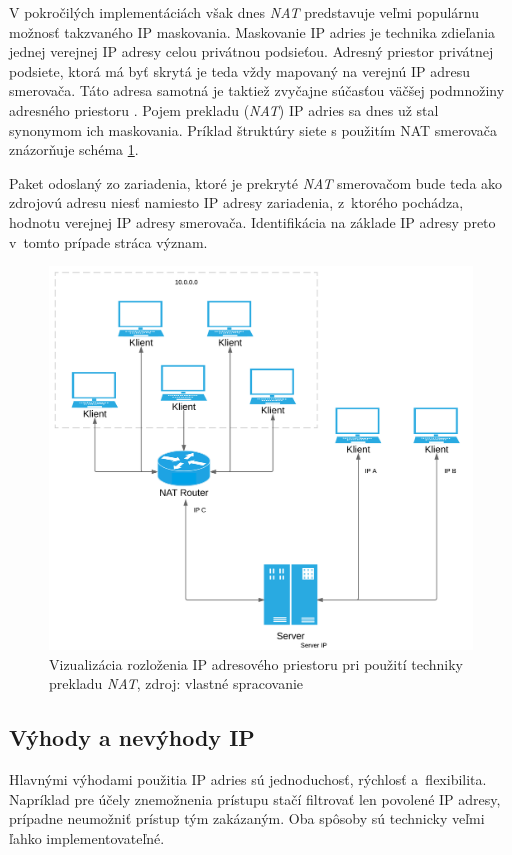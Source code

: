 \documentclass[
  printed, %
  table,   %
  lof,     %
  nolot,   %
  nocover
]{fithesis3}
\begin{document}
V pokročilých
implementáciách však dnes \textit{NAT} predstavuje veľmi populárnu možnosť
takzvaného  IP maskovania. Maskovanie IP adries je technika zdieľania jednej
verejnej IP adresy celou privátnou podsieťou. Adresný priestor privátnej
podsiete, ktorá má byť skrytá je teda vždy mapovaný na verejnú IP adresu
smerovača. Táto adresa samotná je taktiež zvyčajne súčasťou väčšej podmnožiny
adresného priestoru \cite{Huston:NAT}. Pojem prekladu (\textit{NAT}) IP adries sa dnes už stal
synonymom ich maskovania. Príklad štruktúry siete s použitím NAT smerovača znázorňuje
schéma \ref{fig:tech-IP-NAT}.

Paket odoslaný zo zariadenia, ktoré je prekryté
\textit{NAT} smerovačom bude teda ako zdrojovú adresu niesť namiesto IP adresy
zariadenia, z~ktorého pochádza, hodnotu verejnej IP adresy smerovača.
Identifikácia na základe IP adresy preto v~tomto prípade stráca význam.

\begin{figure}[H]
  \centering
    \includegraphics[width=.93\textwidth]{images/tech-IP-NAT.png}
  \caption{Vizualizácia rozloženia IP adresového priestoru pri použití techniky
  prekladu \textit{NAT}, zdroj: vlastné spracovanie}
  \label{fig:tech-IP-NAT}
\end{figure}

\subsection{Výhody a nevýhody IP}
Hlavnými výhodami použitia IP adries sú jednoduchosť, rýchlosť a~flexibilita.
Napríklad pre účely znemožnenia prístupu stačí filtrovať len povolené IP
adresy, prípadne neumožniť prístup tým zakázaným. Oba spôsoby sú technicky veľmi
ľahko implementovateľné.
\end{document}
